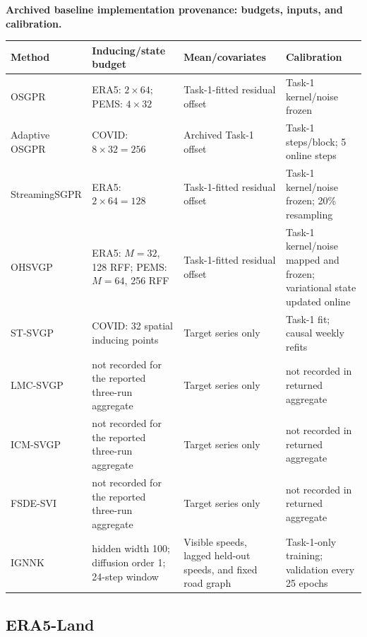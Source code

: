 \begin{table}[H]
\centering
{\small\bfseries Archived baseline implementation provenance: budgets, inputs, and calibration.}\par\smallskip
\small
\setlength{\tabcolsep}{4pt}
\renewcommand{\arraystretch}{1.18}
\begin{tabularx}{\textwidth}{@{}>{\raggedright\arraybackslash}p{}>{\raggedright\arraybackslash}p{}>{\raggedright\arraybackslash}p{}>{\raggedright\arraybackslash}X@{}}
\toprule
Method & Inducing/state budget & Mean/covariates & Calibration \\
\midrule
OSGPR & ERA5: $2{\times}64$; PEMS: $4{\times}32$ & Task-1-fitted residual offset & Task-1 kernel/noise frozen \\
Adaptive OSGPR & COVID: $8{\times}32=256$ & Archived Task-1 offset & 25 Task-1 steps/block; 5 online steps \\
StreamingSGPR & ERA5: $2{\times}64=128$ & Task-1-fitted residual offset & Task-1 kernel/noise frozen; 20\% resampling \\
OHSVGP & ERA5: $M=32$, 128 RFF; PEMS: $M=64$, 256 RFF & Task-1-fitted residual offset & Task-1 kernel/noise mapped and frozen; variational state updated online \\
ST-SVGP & COVID: 32 spatial inducing points & Target series only & Task-1 fit; causal weekly refits \\
LMC-SVGP & not recorded for the reported three-run aggregate & Target series only & not recorded in returned aggregate \\
ICM-SVGP & not recorded for the reported three-run aggregate & Target series only & not recorded in returned aggregate \\
FSDE-SVI & not recorded for the reported three-run aggregate & Target series only & not recorded in returned aggregate \\
IGNNK & hidden width 100; diffusion order 1; 24-step window & Visible speeds, lagged held-out speeds, and fixed road graph & Task-1-only training; validation every 25 epochs \\
\bottomrule
\end{tabularx}
\end{table}

\subsection{ERA5-Land}

